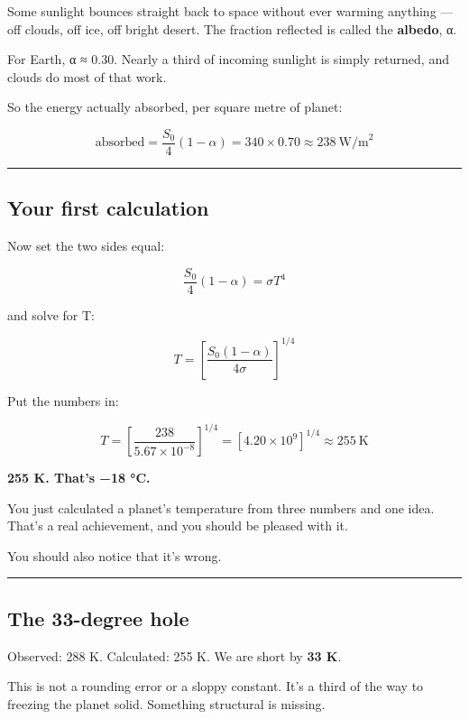 Some sunlight bounces straight back to space without ever warming
anything --- off clouds, off ice, off bright desert. The fraction
reflected is called the \textbf{albedo}, α.

For Earth, α ≈ 0.30. Nearly a third of incoming sunlight is simply
returned, and clouds do most of that work.

So the energy actually absorbed, per square metre of planet:

\[ \text{absorbed} = \frac{S_0}{4}(1 - \alpha) = 340 \times 0.70 \approx 238 \ \text{W/m}^2 \]

\begin{center}\rule{0.5\linewidth}{0.5pt}\end{center}

\subsection{Your first calculation}\label{your-first-calculation}

Now set the two sides equal:

\[ \frac{S_0}{4}(1-\alpha) = \sigma T^4 \]

and solve for T:

\[ T = \left[ \frac{S_0(1-\alpha)}{4\sigma} \right]^{1/4} \]

Put the numbers in:

\[ T = \left[ \frac{238}{5.67 \times 10^{-8}} \right]^{1/4} = \left[ 4.20 \times 10^{9} \right]^{1/4} \approx 255 \ \text{K} \]

\textbf{255 K. That's −18 °C.}

You just calculated a planet's temperature from three numbers and one
idea. That's a real achievement, and you should be pleased with it.

You should also notice that it's wrong.

\begin{center}\rule{0.5\linewidth}{0.5pt}\end{center}

\subsection{The 33-degree hole}\label{the-33-degree-hole}

Observed: 288 K. Calculated: 255 K. We are short by \textbf{33 K}.

This is not a rounding error or a sloppy constant. It's a third of the
way to freezing the planet solid. Something structural is missing.

